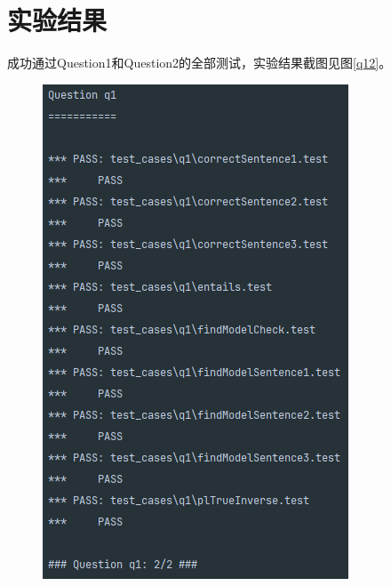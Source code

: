 \section{实验结果}
%
%
成功通过Question1和Question2的全部测试，实验结果截图见图\ref{q12}。
\begin{figure}[!htbp]
    \centering
    \begin{minipage}[t]{0.4\textwidth}
    \centering
    \includegraphics[width=\textwidth]{pic/q1.png}
    \end{minipage}
    \begin{minipage}[t]{0.4\textwidth}

\end{minipage}
\end{figure}
